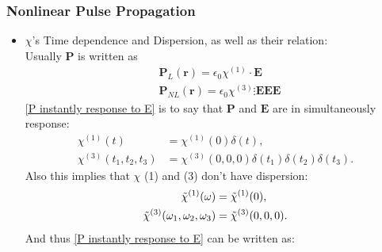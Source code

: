 \documentclass[12pt]{extarticle}
\numberwithin{equation}{section}
\numberwithin{figure}{section}
\numberwithin{table}{section}
\newcommand{\<}{\langle}
\renewcommand{\>}{\rangle}
\theoremstyle{definition}
\begin{document}
        \subsubsection{Nonlinear Pulse Propagation}
        \begin{itemize}
            \item $\chi$'s Time dependence and Dispersion, as well as their relation:\\
                Usually $\boldsymbol{P}$ is written as
                \begin{subequations}
                    \begin{align}
                        &\boldsymbol{P}_L(\boldsymbol{r}) = \epsilon_0 \chi^{(1)}\cdot\boldsymbol{E}\\
                        &\boldsymbol{P}_{NL}(\boldsymbol{r}) = \epsilon_0 \chi^{(3)} \vdots \boldsymbol{EEE}
                    \end{align}
                    \label{P instantly response to E}
                \end{subequations}
                \autoref{P instantly response to E} is to say that $\boldsymbol{P}$ and $\boldsymbol{E}$ are in simultaneously response:
                \begin{subequations}
                    \begin{align}
                        \chi^{(1)}(t)&=\chi^{(1)}(0)\delta(t),\\
                        \chi^{(3)}(t_1,t_2,t_3)&=\chi^{(3)}(0,0,0)\delta(t_1)\delta(t_2)\delta(t_3).
                    \end{align}
                    \label{no dispersion chi: time domain}
                \end{subequations}
                Also this implies that $\chi$ (1) and (3) don't have dispersion:
                \begin{subequations}
                    \begin{align}
                        \Tilde{\chi}^{(1)}(\omega)&=\Tilde{\chi}^{(1)}(0),\\
                        \Tilde{\chi}^{(3)}(\omega_1,\omega_2,\omega_3)&=\Tilde{\chi}^{(3)}(0,0,0).
                    \end{align}
                    \label{no dispersion chi: freq domain}
                \end{subequations}
                And thus \autoref{P instantly response to E} can be written as:
                \begin{subequations}

\end{subequations}
\end{itemize}
\end{document}
